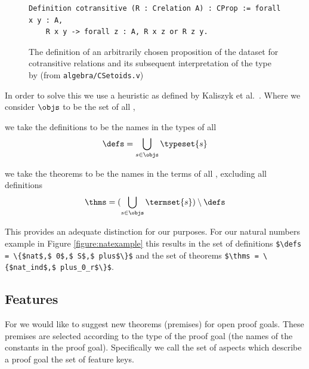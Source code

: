 \begin{figure}[H]
	\begin{lstlisting}[language=Coq, mathescape]
Definition cotransitive (R : Crelation A) : CProp := forall x y : A,
	R x y -> forall z : A, R x z or R z y.
	\end{lstlisting}
	
	
	\caption{The definition of an arbitrarily chosen \cprop proposition of the \corn dataset for cotransitive relations
		and its subsequent interpretation of the type by \coq (from \texttt{algebra/CSetoids.v})}
\end{figure}

In order to solve this we use a heuristic as defined by Kaliszyk et al.\ \cite{kaliszyk2014machine}.
Where we consider $\objs$ to be the set of all \coqobjs,

\begin{definition}\label{def:defs}
  we take the definitions to be the names in the types of all \coqobjs
  \[ \defs = \bigcup_{s \in \objs} \typeset{s} \]
\end{definition}

\begin{definition}\label{def:thms}
  we take the theorems to be the names in the terms of all \coqobjs, excluding all definitions
  \[ \thms = (\bigcup_{s \in \objs} \termset{s}) \setminus \defs \]
\end{definition}

This provides an adequate distinction for our purposes.
For our natural numbers example in Figure \ref{figure:natexample} this results in the set of definitions
\lstinline[language=Coq, mathescape, frame=none]|$\defs = \{$nat$,$ 0$,$ S$,$ plus$\}$|
and the set of theorems
\lstinline[language=Coq, mathescape, frame=none]|$\thms = \{$nat_ind$,$ plus_0_r$\}$|.

\subsection{Features}
\label{section:feats}

For \premiseselection we would like to suggest new theorems (premises) for open proof goals.
These premises are selected according to the type of the proof goal (the names of the constants in the proof goal).
Specifically we call the set of aspects which describe a proof goal the set of feature keys.

